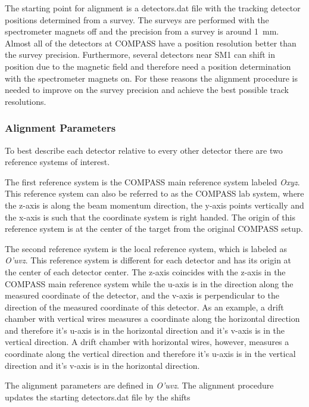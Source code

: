 The starting point for alignment is a detectors.dat file with the tracking
detector positions determined from a survey.  The surveys are performed with the
spectrometer magnets off and the precision from a survey is around 1~mm.  Almost
all of the detectors at COMPASS have a position resolution better than the
survey precision.  Furthermore, several detectors near SM1 can shift in position
due to the magnetic field and therefore need a position determination with the
spectrometer magnets on.  For these reasons the alignment procedure is needed to
improve on the survey precision and achieve the best possible track resolutions.

\subsubsection{Alignment Parameters}

To best describe each detector relative to every other detector there are two
reference systems of interest.

The first reference system is the COMPASS main reference system labeled
\textit{Oxyz}.  This reference system can also be referred to as the COMPASS lab
system, where the z-axis is along the beam momentum direction, the y-axis points
vertically and the x-axis is such that the coordinate system is right handed.
The origin of this reference system is at the center of the target from the
original COMPASS setup.

The second reference system is the local reference system, which is labeled as
\textit{O'uvz}.  This reference system is different for each detector and has
its origin at the center of each detector center.  The z-axis coincides with the
z-axis in the COMPASS main reference system while the u-axis is in the direction
along the measured coordinate of the detector, and the v-axis is perpendicular to
the direction of the measured coordinate of this detector.  As an example, a drift
chamber with vertical wires measures a coordinate along the horizontal direction
and therefore it's u-axis is in the horizontal direction and it's v-axis is in
the vertical direction.  A drift chamber with horizontal wires, however,
measures a coordinate along the vertical direction and therefore it's u-axis is
in the vertical direction and it's v-axis is in the horizontal direction.

The alignment parameters are defined in \textit{O'uvz}.  The alignment procedure
updates the starting detectors.dat file by the shifts

